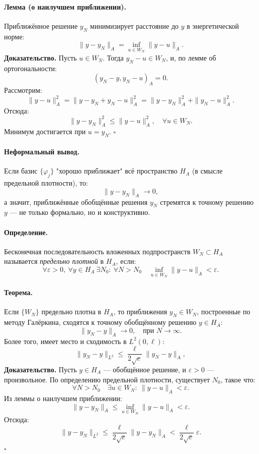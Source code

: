 \paragraph{Лемма (о наилучшем приближении).}
Приближённое решение $y_N$ минимизирует расстояние до $y$ в энергетической норме:
\[
\|y - y_N\|_A = \inf_{u \in W_N} \|y - u\|_A.
\]
\textbf{Доказательство.}
Пусть $u \in W_N$. Тогда $y_N - u \in W_N$, и, по лемме об ортогональности:
\[
(y_N - y, y_N - u)_A = 0.
\]
Рассмотрим:
\[
\|y - u\|_A^2 = \|y - y_N + y_N - u\|_A^2 = \|y - y_N\|_A^2 + \|y_N - u\|_A^2.
\]
Отсюда:
\[
\|y - y_N\|_A^2 \le \|y - u\|_A^2, \quad \forall u \in W_N.
\]
Минимум достигается при $u = y_N$. \hfill $\square$

\paragraph{Неформальный вывод.}

Если базис $\{\varphi_j\}$ "хорошо приближает" всё пространство $H_A$ (в смысле предельной плотности), то:
\[
\|y - y_N\|_A \to 0,
\]
а значит, приближённые обобщённые решения $y_N$ стремятся к точному решению $y$ — не только формально, но и конструктивно.

\paragraph{Определение.}
Бесконечная последовательность вложенных подпространств $W_N \subset H_A$ называется \textit{предельно плотной} в $H_A$, если:
\[
\forall \varepsilon > 0, \ \forall y \in H_A \ \exists N_0: \ \forall N > N_0 \quad \inf_{u \in W_N} \|y - u\|_A < \varepsilon.
\]

\paragraph{Теорема.}
Если $\{W_N\}$ предельно плотна в $H_A$, то приближения $y_N \in W_N$, построенные по методу Галёркина, сходятся к точному обобщённому решению $y \in H_A$:
\[
\|y_N - y\|_A \to 0, \quad \text{при } N \to \infty.
\]
Более того, имеет место и сходимость в $L^2(0,\ell)$:
\[
\|y_N - y\|_{L^2} \le \frac{\ell}{2\sqrt{c}} \|y_N - y\|_A,
\]
\textbf{Доказательство.}
Пусть $y \in H_A$ — обобщённое решение, и $\varepsilon > 0$ — произвольное. По определению предельной плотности, существует $N_0$, такое что:
\[
\forall N > N_0 \quad \exists u \in W_N: \ \|y - u\|_A < \varepsilon.
\]
Из леммы о наилучшем приближении:
\[
\|y - y_N\|_A \le \inf_{u \in W_N} \|y - u\|_A < \varepsilon.
\]
Отсюда:
\[
\|y - y_N\|_{L^2} \le \frac{\ell}{2\sqrt{c}} \|y - y_N\|_A < \frac{\ell}{2\sqrt{c}} \varepsilon.
\]
\hfill $\square$

